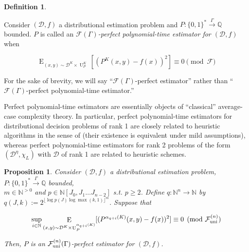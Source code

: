 \documentclass[11pt]{article}
\numberwithin{equation}{section}
\theoremstyle{definition}
\newtheorem{definition}{Definition}[section]
\theoremstyle{plain}
\newtheorem{proposition}{Proposition}[section]
\newcommand{\Bool}{\{0,1\}}
\newcommand{\Words}{{\Bool^*}}
\DeclareMathOperator{\E}{E}
\DeclareMathOperator{\Un}{U}
\newcommand{\Nats}{\mathbb{N}}
\newcommand{\Rats}{\mathbb{Q}}
\newcommand{\NatPolyJ}{\Nats[J_0, J_1 \ldots J_{n-2}]}
\newcommand{\NatFun}{\Nats^n \rightarrow}
\newcommand{\Floor}[1]{\lfloor #1 \rfloor}
\newcommand{\Dist}{\mathcal{D}}
\newcommand{\Fall}{\mathcal{F}}
\newcommand{\EG}{\Fall(\Gamma)}
\newcommand{\FallU}{{\Fall_{\textnormal{uni}}^{(n)}}}
\newcommand{\Scheme}{\xrightarrow{\Gamma}}
\begin{document}
\begin{samepage}
\begin{definition}
\label{def:perfect}

Consider ${(\Dist, f)}$ a distributional estimation problem and ${P: \Words \Scheme \Rats}$ bounded. ${P}$ is called an \emph{${\EG}$-perfect polynomial-time estimator for ${(\Dist,f)}$} when 

\begin{equation}
\E_{(x,y) \sim \Dist^K \times \Un_P^K}[(P^K(x,y)-f(x))^2] \equiv 0 \pmod \Fall
\end{equation}

For the sake of brevity, we will say \enquote{${\EG}$-perfect estimator} rather than \enquote{${\EG}$-perfect polynomial-time estimator.}

\end{definition}
\end{samepage}

Perfect polynomial-time estimators are essentially objects of \enquote{classical} average-case complexity theory. In particular, perfect polynomial-time estimators for distributional decision problems of rank 1 are closely related to heuristic algorithms in the sense of \cite{Bogdanov_2006} (their existence is equivalent under mild assumptions), whereas perfect polynomial-time estimators for rank 2 problems of the form ${(\Dist^\eta,\chi_L)}$ with ${\Dist}$ of rank 1 are related to heuristic schemes.

\begin{samepage}
\begin{proposition}
\label{prp:fall_uni_qpoly}
Consider ${(\Dist,f)}$ a distributional estimation problem, ${P: \Words \Scheme \Rats}$ bounded,\\ $m \in \Nats^{>0}$ and ${p \in \NatPolyJ}$ s.t. ${p \geq 2}$. Define ${q: \NatFun \Nats}$ by $q(J,k):=2^{\Floor{\log p(J)\log \max(k,1)}^m}$. Suppose that 

\begin{equation}
\label{eqn:prp__fall_uni_qpoly}
\sup_{i \in \Nats} \E_{(x,y) \sim \Dist^K \times \Un_P^{\alpha_{q+i}(K)}}[(P^{\alpha_{q+i}(K)}(x,y)-f(x))^2] \equiv 0 \pmod \FallU
\end{equation}

Then, ${P}$ is an ${\FallU(\Gamma)}$-perfect estimator for ${(\Dist,f)}$.

\end{proposition}
\end{samepage}
\end{document}
